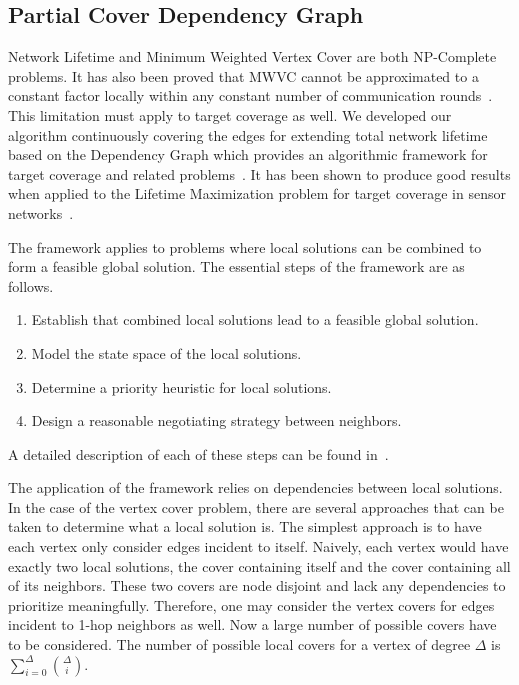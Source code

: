 \subsection{Partial Cover Dependency Graph}
\label{sec:life-depend}
Network Lifetime and Minimum Weighted Vertex Cover are both NP-Complete problems. It has also been proved that MWVC cannot be approximated to a constant factor locally within any constant number of communication rounds~\cite{1011811}. This limitation must apply to target coverage as well. We developed our algorithm continuously covering the edges for extending total network lifetime based on the Dependency Graph which provides an algorithmic framework for target coverage and related problems~\cite{IPDPS.2008.45361}. It has been shown to produce good results when applied to the Lifetime Maximization problem for target coverage in sensor networks~\cite{978-3-540-89894-8_26}.

The framework applies to problems where local solutions can be combined to form a feasible global solution. The essential steps of the framework are as follows. 
\begin{enumerate}
\item Establish that combined local solutions lead to a feasible global solution.
\item Model the state space of the local solutions.
\item Determine a priority heuristic for local solutions.
\item Design a reasonable negotiating strategy between neighbors.
\end{enumerate} 
A detailed description of each of these steps can be found in~\cite{IPDPS.2008.45361}.

The application of the framework relies on dependencies between local solutions. In the case of the vertex cover problem, there are several approaches that can be taken to determine what a local solution is. The simplest approach is to have each vertex only consider edges incident to itself. Naively, each vertex would have exactly two local solutions, the cover containing itself and the cover containing all of its neighbors. These two covers are node disjoint and lack any dependencies to prioritize meaningfully.   Therefore, one may consider the vertex covers for edges incident to 1-hop neighbors as well. Now a large number of possible covers have to be considered. The number of possible local covers for a vertex of degree $\Delta$ is $\sum_{i=0}^\Delta \binom{\Delta}{i}$. 


